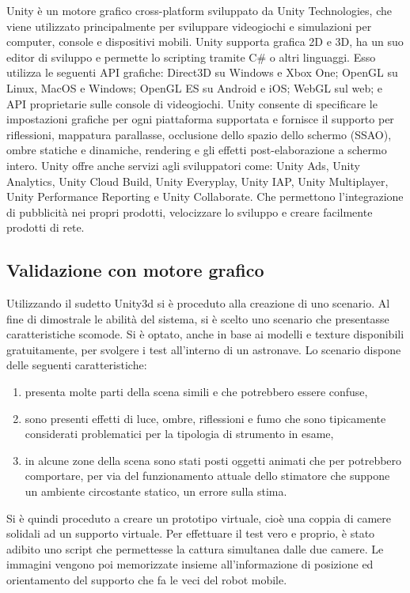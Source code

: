 Unity è un motore grafico cross-platform sviluppato da Unity Technologies, che viene utilizzato principalmente per sviluppare videogiochi e simulazioni per computer, console e dispositivi mobili. Unity supporta grafica 2D e 3D, ha un suo editor di sviluppo e permette lo scripting tramite C\# o altri linguaggi. Esso utilizza le seguenti API grafiche: Direct3D su Windows e Xbox One; OpenGL su Linux, MacOS e Windows; OpenGL ES su Android e iOS; WebGL sul web; e API proprietarie sulle console di videogiochi.
Unity consente di specificare le impostazioni grafiche per ogni piattaforma supportata e fornisce il supporto per riflessioni, mappatura parallasse, occlusione dello spazio dello schermo (SSAO), ombre statiche e dinamiche, rendering e gli effetti post-elaborazione a schermo intero. 
Unity offre anche servizi agli sviluppatori come: Unity Ads, Unity Analytics, Unity Cloud Build, Unity Everyplay, Unity IAP, Unity Multiplayer, Unity Performance Reporting e Unity Collaborate. Che permettono l'integrazione di pubblicità nei propri prodotti, velocizzare lo sviluppo e creare facilmente prodotti di rete.


\subsection{Validazione con motore grafico}
\label{sec:valid}
Utilizzando il sudetto Unity3d si è proceduto alla creazione di uno scenario. Al fine di dimostrale le abilità del sistema, si è scelto uno scenario che presentasse caratteristiche scomode. Si è optato, anche in base ai modelli e texture disponibili gratuitamente, per svolgere i test all'interno di un astronave. Lo scenario dispone delle seguenti caratteristiche:
\begin{enumerate}
	\item presenta molte parti della scena simili e che potrebbero essere confuse,
	\item sono presenti effetti di luce, ombre, riflessioni e fumo che sono tipicamente considerati problematici per la tipologia di strumento in esame,
	\item in alcune zone della scena sono stati posti oggetti animati che per potrebbero comportare, per via del funzionamento attuale dello stimatore che suppone un ambiente circostante statico, un errore sulla stima.
\end{enumerate}

Si è quindi proceduto a creare un prototipo virtuale, cioè una coppia di camere solidali ad un supporto virtuale. Per effettuare il test vero e proprio, è stato adibito uno script che permettesse la cattura simultanea dalle due camere. Le immagini vengono poi memorizzate insieme all'informazione di posizione ed orientamento del supporto che fa le veci del robot mobile.

